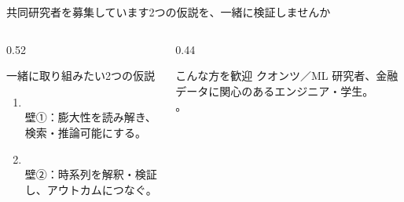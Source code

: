 \begin{frame}{共同研究者を募集しています}{2つの仮説を、一緒に検証しませんか}
  \begin{columns}[T]
    \begin{column}{0.52\textwidth}
      \begin{casestudy}{一緒に取り組みたい2つの仮説}
        \footnotesize
        \begin{enumerate}\setlength\itemsep{1.4mm}
          \item {}\\
            {\scriptsize\color{brandgray} 壁①：膨大性を読み解き、検索・推論可能にする。}
          \item {}\\
            {\scriptsize\color{brandgray} 壁②：時系列を解釈・検証し、アウトカムにつなぐ。}
        \end{enumerate}
      \end{casestudy}
    \end{column}
    \begin{column}{0.44\textwidth}
      \begin{insight}{こんな方を歓迎}
        \footnotesize
        クオンツ／ML 研究者、金融データに関心のあるエンジニア・学生。\\[1.5mm]
        。
      \end{insight}
    \end{column}
  \end{columns}
  \vskip0.5mm
  \begin{center}
  \end{center}
\end{frame}

